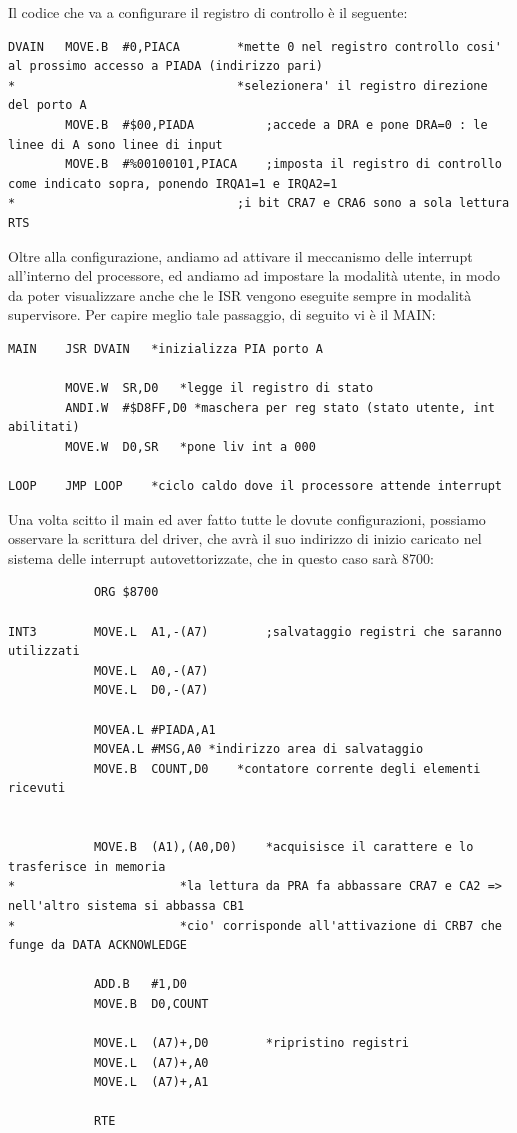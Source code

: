 Il codice che va a configurare il registro di controllo è il seguente:
\begin{lstlisting}
DVAIN	MOVE.B	#0,PIACA		*mette 0 nel registro controllo cosi' al prossimo accesso a PIADA (indirizzo pari)
*								*selezionera' il registro direzione del porto A
        MOVE.B	#$00,PIADA		    ;accede a DRA e pone DRA=0 : le linee di A sono linee di input	
        MOVE.B	#%00100101,PIACA  	;imposta il registro di controllo come indicato sopra, ponendo IRQA1=1 e IRQA2=1
*								;i bit CRA7 e CRA6 sono a sola lettura	
RTS
\end{lstlisting}

Oltre alla configurazione, andiamo ad attivare il meccanismo delle interrupt all'interno del processore, ed andiamo ad impostare la modalità utente, in modo da poter visualizzare anche che le ISR vengono eseguite sempre in modalità supervisore. Per capire meglio tale passaggio, di seguito vi è il MAIN:
\begin{lstlisting}
MAIN	JSR	DVAIN	*inizializza PIA porto A
            
        MOVE.W	SR,D0	*legge il registro di stato
        ANDI.W	#$D8FF,D0 *maschera per reg stato (stato utente, int abilitati)
        MOVE.W	D0,SR	*pone liv int a 000

LOOP  	JMP LOOP	*ciclo caldo dove il processore attende interrupt	
\end{lstlisting}

Una volta scitto il main ed aver fatto tutte le dovute configurazioni, possiamo osservare la scrittura del driver, che avrà il suo indirizzo di inizio caricato nel sistema delle interrupt autovettorizzate, che in questo caso sarà 8700:
\begin{lstlisting}
            ORG $8700		

INT3        MOVE.L  A1,-(A7)		;salvataggio registri che saranno utilizzati
            MOVE.L  A0,-(A7)
            MOVE.L  D0,-(A7)

            MOVEA.L	#PIADA,A1
            MOVEA.L	#MSG,A0	*indirizzo area di salvataggio              
            MOVE.B	COUNT,D0	*contatore corrente degli elementi ricevuti

    
            MOVE.B 	(A1),(A0,D0)	*acquisisce il carattere e lo trasferisce in memoria
*						*la lettura da PRA fa abbassare CRA7 e CA2 => nell'altro sistema si abbassa CB1
*						*cio' corrisponde all'attivazione di CRB7 che funge da DATA ACKNOWLEDGE
    
            ADD.B	#1,D0
            MOVE.B	D0,COUNT

            MOVE.L  (A7)+,D0		*ripristino registri 
            MOVE.L  (A7)+,A0
            MOVE.L  (A7)+,A1
            
            RTE
\end{lstlisting}


